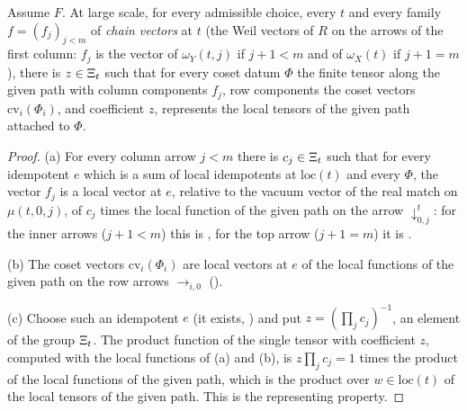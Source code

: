\begin{lemma}\label{pf:rowprops:swapped}
Assume $F$. At large scale, for every admissible choice, every $t$ and every family $f=(f_j)_{j<m}$ of \emph{chain
vectors} at $t$ (the Weil vectors of $R$ on the arrows of the first column: $f_j$ is the vector of $\omega_Y(t,j)$ if
$j+1<m$ and of $\omega_X(t)$ if $j+1=m$), there is $z\in\Xi_t$ such that for every coset datum $\Phi$ the finite
tensor along the given path with column components $f_j$, row components the coset vectors $\mathrm{cv}_i(\Phi_i)$, and
coefficient $z$, represents the local tensors of the given path attached to $\Phi$.
\end{lemma}

\begin{proof}
(a) For every column arrow $j<m$ there is $c_j\in\Xi_t$ such that for every idempotent $e$ which is a sum of local
idempotents at $\mathrm{loc}(t)$ and every $\Phi$, the vector $f_j$ is a local vector at $e$, relative to the vacuum vector of
the real match on $\mu(t,0,j)$, of $c_j$ times the local function of the given path on the arrow $\downarrow^t_{0,j}$: for the
inner arrows ($j+1<m$) this is , for the top arrow ($j+1=m$) it is
.

(b) The coset vectors $\mathrm{cv}_i(\Phi_i)$ are local vectors at $e$ of the local functions of the given path on the
row arrows $\rightarrow_{i,0}$ ().

(c) Choose such an idempotent $e$ (it exists, ) and put
$z=(\prod_jc_j)^{-1}$, an element of the group $\Xi_t$. The product function of the single tensor with coefficient
$z$, computed with the local functions of (a) and (b), is $z\prod_jc_j=1$ times the product of the local functions of
the given path, which is the product over $w\in\mathrm{loc}(t)$ of the local tensors of the given path. This is the
representing property.
\end{proof}


